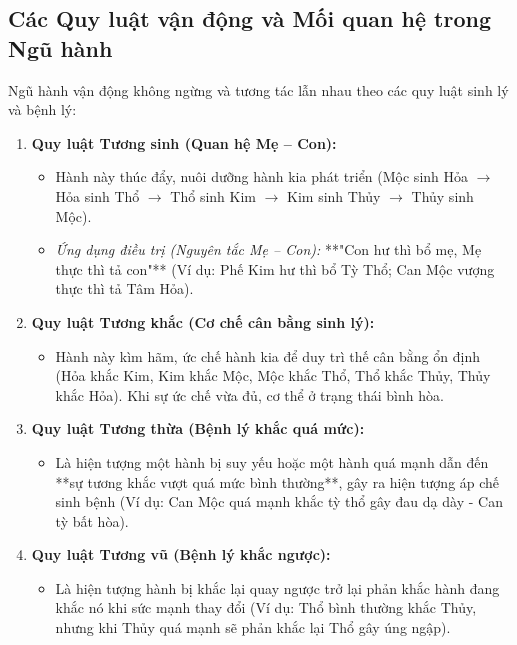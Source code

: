 \subsection{Các Quy luật vận động và Mối quan hệ trong Ngũ hành}

Ngũ hành vận động không ngừng và tương tác lẫn nhau theo các quy luật sinh lý và bệnh lý:

\begin{enumerate}
    \item \textbf{Quy luật Tương sinh (Quan hệ Mẹ -- Con):}
    \begin{itemize}
        \item Hành này thúc đẩy, nuôi dưỡng hành kia phát triển (Mộc sinh Hỏa $\rightarrow$ Hỏa sinh Thổ $\rightarrow$ Thổ sinh Kim $\rightarrow$ Kim sinh Thủy $\rightarrow$ Thủy sinh Mộc).
        \item \textit{Ứng dụng điều trị (Nguyên tắc Mẹ -- Con):} **"Con hư thì bổ mẹ, Mẹ thực thì tả con"** (Ví dụ: Phế Kim hư thì bổ Tỳ Thổ; Can Mộc vượng thực thì tả Tâm Hỏa).
    \end{itemize}

    \item \textbf{Quy luật Tương khắc (Cơ chế cân bằng sinh lý):}
    \begin{itemize}
        \item Hành này kìm hãm, ức chế hành kia để duy trì thế cân bằng ổn định (Hỏa khắc Kim, Kim khắc Mộc, Mộc khắc Thổ, Thổ khắc Thủy, Thủy khắc Hỏa). Khi sự ức chế vừa đủ, cơ thể ở trạng thái bình hòa.
    \end{itemize}

    \item \textbf{Quy luật Tương thừa (Bệnh lý khắc quá mức):}
    \begin{itemize}
        \item Là hiện tượng một hành bị suy yếu hoặc một hành quá mạnh dẫn đến **sự tương khắc vượt quá mức bình thường**, gây ra hiện tượng áp chế sinh bệnh (Ví dụ: Can Mộc quá mạnh khắc tỳ thổ gây đau dạ dày - Can tỳ bất hòa).
    \end{itemize}

    \item \textbf{Quy luật Tương vũ (Bệnh lý khắc ngược):}
    \begin{itemize}
        \item Là hiện tượng hành bị khắc lại quay ngược trở lại phản khắc hành đang khắc nó khi sức mạnh thay đổi (Ví dụ: Thổ bình thường khắc Thủy, nhưng khi Thủy quá mạnh sẽ phản khắc lại Thổ gây úng ngập).
    \end{itemize}
\end{enumerate}

